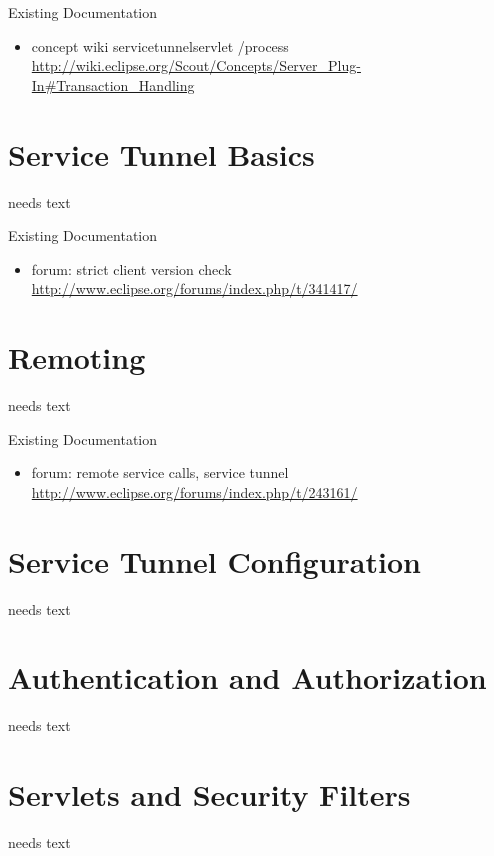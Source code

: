 \documentclass[a4paper,10pt,twoside]{book}
\begin{document}
\noindent Existing Documentation
\begin{itemize}
  \item concept wiki servicetunnelservlet /process \url{http://wiki.eclipse.org/Scout/Concepts/Server_Plug-In#Transaction_Handling}
\end{itemize}

\section{Service Tunnel Basics}
needs text

\noindent Existing Documentation
\begin{itemize}
  \item forum: strict client version check \url{http://www.eclipse.org/forums/index.php/t/341417/}
\end{itemize}

\section{Remoting}
needs text

\noindent Existing Documentation
\begin{itemize}
  \item forum: remote service calls, service tunnel \url{http://www.eclipse.org/forums/index.php/t/243161/}
\end{itemize}

\section{Service Tunnel Configuration}
needs text
  
\section{Authentication and Authorization}
needs text

\section{Servlets and Security Filters}
needs text
\end{document}
